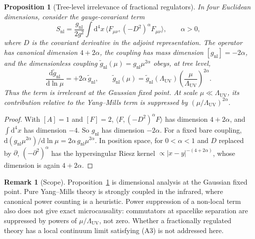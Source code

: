 \documentclass[11pt,a4paper]{amsart}
\newtheorem{proposition}[theorem]{Proposition}
\theoremstyle{definition}
\newtheorem{remark}[theorem]{Remark}
\newcommand{\diff}{\mathrm{d}}
\begin{document}
\begin{proposition}[Tree-level irrelevance of fractional regulators]
\label{prop:irrelevance}
In four Euclidean dimensions, consider the gauge-covariant term
\begin{equation}
    S_{\mathrm{nl}} = \frac{g_{\mathrm{nl}}}{2 g^2} \int \diff^4x \, \langle F_{\mu\nu}, (-D^2)^{\alpha} F_{\mu\nu} \rangle, \qquad \alpha > 0,
\end{equation}
where $D$ is the covariant derivative in the adjoint representation. The operator has canonical dimension $4 + 2\alpha$, the coupling has mass dimension $[g_{\mathrm{nl}}] = -2\alpha$, and the dimensionless coupling $\tilde{g}_{\mathrm{nl}}(\mu) = g_{\mathrm{nl}}\mu^{2\alpha}$ obeys, at tree level,
\begin{equation}
    \frac{\diff \tilde{g}_{\mathrm{nl}}}{\diff \ln \mu} = + 2\alpha \, \tilde{g}_{\mathrm{nl}}, \qquad \tilde{g}_{\mathrm{nl}}(\mu) = \tilde{g}_{\mathrm{nl}}(\Lambda_{\mathrm{UV}}) \left( \frac{\mu}{\Lambda_{\mathrm{UV}}} \right)^{2\alpha}.
\end{equation}
Thus the term is irrelevant at the Gaussian fixed point. At scale $\mu \ll \Lambda_{\mathrm{UV}}$, its contribution relative to the Yang--Mills term is suppressed by $(\mu/\Lambda_{\mathrm{UV}})^{2\alpha}$.
\end{proposition}

\begin{proof}
With $[A] = 1$ and $[F] = 2$, $\langle F, (-D^2)^\alpha F\rangle$ has dimension $4 + 2\alpha$, and $\int \diff^4x$ has dimension $-4$. So $g_{\mathrm{nl}}$ has dimension $-2\alpha$. For a fixed bare coupling, $\diff(g_{\mathrm{nl}}\mu^{2\alpha})/\diff\ln\mu = 2\alpha\, g_{\mathrm{nl}}\mu^{2\alpha}$. In position space, for $0<\alpha<1$ and $D$ replaced by $\partial$, $(-\partial^2)^\alpha$ has the hypersingular Riesz kernel $\propto |x-y|^{-(4+2\alpha)}$, whose dimension is again $4 + 2\alpha$.
\end{proof}

\begin{remark}[Scope]
Proposition~\ref{prop:irrelevance} is dimensional analysis at the Gaussian fixed point. Pure Yang--Mills theory is strongly coupled in the infrared, where canonical power counting is a heuristic. Power suppression of a non-local term also does not give exact microcausality: commutators at spacelike separation are suppressed by powers of $\mu/\Lambda_{\mathrm{UV}}$, not zero. Whether a fractionally regulated theory has a local continuum limit satisfying (A3) is not addressed here.
\end{remark}
\end{document}
